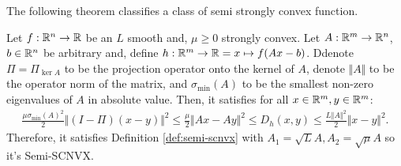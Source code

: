 \documentclass[12pt]{article}
\begin{document}
        The following theorem classifies a class of semi strongly convex function. 
        \begin{theorem}\label{thm:aff-smooth-sq-scnvx}
            Let $f: \mathbb R^n \rightarrow \mathbb R$ be an $L$ smooth and, $\mu \ge 0$ strongly convex.
            Let $A: \mathbb R^m \rightarrow \mathbb R^n$, $b \in \mathbb R^n$ be arbitrary and, define $h: \mathbb R^m \rightarrow \mathbb R= x \mapsto f(Ax - b)$. 
            Ddenote $\Pi = \Pi_{\ker A}$ to be the projection operator onto the kernel of $A$, denote $\Vert A\Vert$ to be the operator norm of the matrix, and $\sigma_{\min}(A)$ to be the smallest non-zero eigenvalues of $A$ in absolute value.
            Then, it satisfies for all $x \in \mathbb R^m, y \in \mathbb R^m$:  
            \begin{align*}
                \frac{\mu \sigma_{\min}(A)^2}{2}\Vert (I - \Pi)(x - y)\Vert^2
                \le \frac{\mu}{2}\Vert Ax - Ay\Vert^2 
                \le D_h(x, y) \le \frac{L\Vert A\Vert^2}{2}\Vert x - y\Vert^2. 
            \end{align*}
            Therefore, it satisfies Definition \ref{def:semi-scnvx} with $A_1 = \sqrt{L}A, A_2 = \sqrt{\mu}A$ so it's Semi-SCNVX. 
        \end{theorem}
\end{document}
